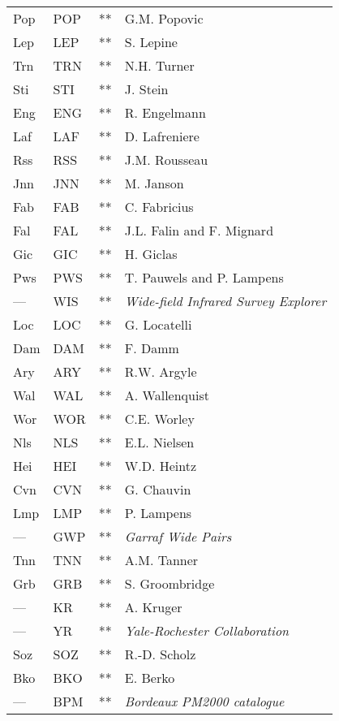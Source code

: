 \begin{longtable}{l|l|c|p{80mm}}
Pop		        	& POP  	& ** & G.M. Popovic \\
Lep		        	& LEP  	& ** & S. Lepine \\
Trn		        	& TRN  	& ** & N.H. Turner \\
Sti		        	& STI  	& ** & J. Stein \\
Eng		        	& ENG  	& ** & R. Engelmann \\
Laf		        	& LAF  	& ** & D. Lafreniere \\
Rss		        	& RSS  	& ** & J.M. Rousseau \\
Jnn		        	& JNN  	& ** & M. Janson \\
Fab		        	& FAB  	& ** & C. Fabricius \\
Fal		        	& FAL  	& ** & J.L. Falin and F. Mignard \\
Gic		        	& GIC  	& ** & H. Giclas \\
Pws		        	& PWS  	& ** & T. Pauwels and P. Lampens \\
---		        	& WIS  	& ** & \emph{Wide-field Infrared Survey Explorer} \\
Loc		        	& LOC  	& ** & G. Locatelli \\
Dam		        	& DAM  	& ** & F. Damm \\
Ary		        	& ARY  	& ** & R.W. Argyle \\
Wal		        	& WAL  	& ** & A. Wallenquist \\
Wor		        	& WOR  	& ** & C.E. Worley \\
Nls		        	& NLS  	& ** & E.L. Nielsen \\
Hei		        	& HEI  	& ** & W.D. Heintz \\
Cvn		        	& CVN 	& ** & G. Chauvin \\
Lmp		        	& LMP 	& ** & P. Lampens \\
---		        	& GWP 	& ** & \emph{Garraf Wide Pairs} \\
Tnn		        	& TNN 	& ** & A.M. Tanner \\
Grb		        	& GRB 	& ** & S. Groombridge \\
---		        	& KR 	& ** & A. Kruger \\
---		        	& YR 	& ** & \emph{Yale-Rochester Collaboration} \\
Soz		        	& SOZ 	& ** & R.-D. Scholz \\
Bko		        	& BKO 	& ** & E. Berko \\
---		        	& BPM 	& ** & \emph{Bordeaux PM2000 catalogue} \\

\end{longtable}
